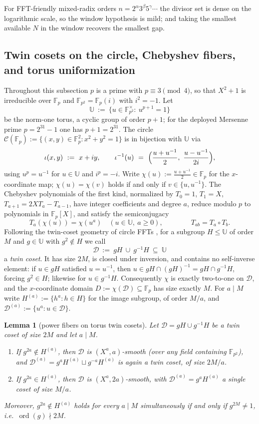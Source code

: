 \documentclass[11pt]{article}
\newtheorem{lemma}[theorem]{Lemma}
\theoremstyle{definition}
\theoremstyle{remark}
\newcommand{\F}{\mathbb{F}}
\newcommand{\UU}{\mathbb{U}}
\begin{document}
For FFT-friendly mixed-radix orders $n=2^{\alpha}3^{\beta}5^{\gamma}\cdots$ the divisor set is dense on the logarithmic scale, so the window hypothesis is mild; and taking the smallest available $N$ in the window recovers the smallest gap.

\subsection{Twin cosets on the circle, Chebyshev fibers, and torus uniformization}
\label{sec:circle-geometry}

Throughout this subsection $p$ is a prime with $p\equiv3\pmod4$, so that $X^2+1$ is irreducible over $\F_p$ and $\F_{p^2}=\F_p(i)$ with $i^2=-1$. Let
\[
\UU\ :=\ \{u\in\F_{p^2}^{\times}:\ u^{p+1}=1\}
\]
be the norm-one torus, a cyclic group of order $p+1$; for the deployed Mersenne prime $p=2^{31}-1$ one has $p+1=2^{31}$. The circle $\mathcal C(\F_p):=\{(x,y)\in\F_p^2:x^2+y^2=1\}$ is in bijection with $\UU$ via
\[
\iota(x,y)\ :=\ x+iy,
\qquad
\iota^{-1}(u)\ =\ \Bigl(\frac{u+u^{-1}}2,\ \frac{u-u^{-1}}{2i}\Bigr),
\]
using $u^p=u^{-1}$ for $u\in\UU$ and $i^p=-i$. Write $\chi(u):=\frac{u+u^{-1}}2\in\F_p$ for the $x$-coordinate map; $\chi(u)=\chi(v)$ holds if and only if $v\in\{u,u^{-1}\}$. The Chebyshev polynomials of the first kind, normalized by $T_0=1$, $T_1=X$, $T_{a+1}=2XT_a-T_{a-1}$, have integer coefficients and degree $a$, reduce modulo $p$ to polynomials in $\F_p[X]$, and satisfy the semiconjugacy
\[
T_a(\chi(u))=\chi(u^a)\quad(u\in\UU,\ a\ge0),
\qquad\qquad
T_{ab}=T_a\circ T_b .
\]
Following the twin-coset geometry of circle FFTs \cite{HLP24}, for a subgroup $H\le\UU$ of order $M$ and $g\in\UU$ with $g^2\notin H$ we call
\[
\mathcal D\ :=\ gH\ \cup\ g^{-1}H\ \subseteq\ \UU
\]
a \emph{twin coset}. It has size $2M$, is closed under inversion, and contains no self-inverse element: if $u\in gH$ satisfied $u=u^{-1}$, then $u\in gH\cap(gH)^{-1}=gH\cap g^{-1}H$, forcing $g^2\in H$; likewise for $u\in g^{-1}H$. Consequently $\chi$ is exactly two-to-one on $\mathcal D$, and the $x$-coordinate domain $D:=\chi(\mathcal D)\subseteq\F_p$ has size exactly $M$. For $a\mid M$ write $H^{(a)}:=\{h^a:h\in H\}$ for the image subgroup, of order $M/a$, and $\mathcal D^{(a)}:=\{u^a:u\in\mathcal D\}$.

\begin{lemma}[power fibers on torus twin cosets]\label{lem:torus-fibers}
Let $\mathcal D=gH\cup g^{-1}H$ be a twin coset of size $2M$ and let $a\mid M$.
\begin{enumerate}[label=\textup{(\alph*)}]
\item If $g^{2a}\notin H^{(a)}$, then $\mathcal D$ is $(X^a,a)$-smooth \textup(over any field containing $\F_{p^2}$\textup), and $\mathcal D^{(a)}=g^aH^{(a)}\sqcup g^{-a}H^{(a)}$ is again a twin coset, of size $2M/a$.
\item If $g^{2a}\in H^{(a)}$, then $\mathcal D$ is $(X^a,2a)$-smooth, with $\mathcal D^{(a)}=g^aH^{(a)}$ a single coset of size $M/a$.
\end{enumerate}
Moreover, $g^{2a}\notin H^{(a)}$ holds for every $a\mid M$ simultaneously if and only if $g^{2M}\ne1$, i.e.\ $\operatorname{ord}(g)\nmid2M$.
\end{lemma}
\end{document}
